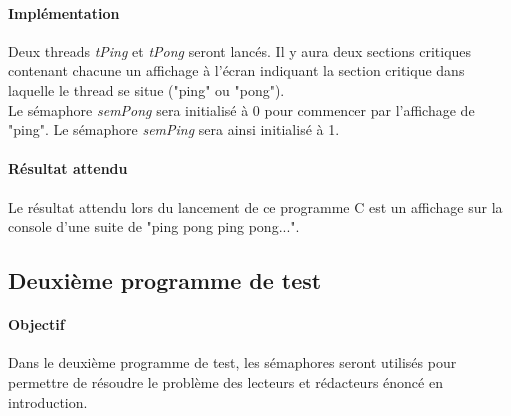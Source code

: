 \documentclass[12pt]{article}
\begin{document}
  \paragraph{Implémentation\\}
  Deux threads \textit{tPing} et \textit{tPong} seront lancés. Il y aura deux sections critiques contenant chacune un affichage à l'écran indiquant la section critique dans laquelle le thread se situe ("ping" ou "pong"). \\
  Le sémaphore \textit{semPong} sera initialisé à 0 pour commencer par l'affichage de "ping". Le sémaphore \textit{semPing} sera ainsi initialisé à 1.
  \paragraph{Résultat attendu\\}
  Le résultat attendu lors du lancement de ce programme C est un affichage sur la console d'une suite de "ping pong ping pong...".
\newpage
\subsection{Deuxième programme de test}
  \paragraph{Objectif\\}
  Dans le deuxième programme de test, les sémaphores seront utilisés pour permettre de résoudre le problème des lecteurs et rédacteurs énoncé en introduction.
\end{document}
